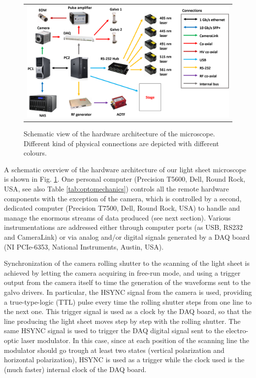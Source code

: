 \documentclass[12pt]{spieman}  %
\begin{document}
	\begin{figure}
   \begin{center}
   \begin{tabular}{c}
   \includegraphics[width=\textwidth]{connectivity.eps}
   \end{tabular}
   \end{center}
   \caption{\label{fig:connectivity} Schematic view of the hardware architecture of the microscope. Different kind of physical connections are depicted with different colours.} 
   \end{figure}

A schematic overview of the hardware architecture of our light sheet microscope is shown in Fig. \ref{fig:connectivity}. One personal computer (Precision T5600, Dell, Round Rock, USA, see also Table \ref{tab:optomechanics}) controls all the remote hardware components with the exception of the camera, which is controlled by a second, dedicated computer (Precision T7500, Dell, Round Rock, USA) to handle and manage the enormous streams of data produced (see next section). Various instrumentations are addressed either through computer ports (as USB, RS232 and CameraLink) or via analog and/or digital signals generated by a DAQ board (NI PCIe-6353, National Instruments, Austin, USA).

Synchronization of the camera rolling shutter to the scanning of the light sheet is achieved by letting the camera acquiring in free-run mode, and using a trigger output from the camera itself to time the generation of the waveforms sent to the galvo drivers. In particular, the HSYNC signal from the camera is used, providing a true-type-logic (TTL) pulse every time the rolling shutter steps from one line to the next one. This trigger signal is used as a clock by the DAQ board, so that the line producing the light sheet moves step by step with the rolling shutter. The same HSYNC signal is used to trigger the DAQ digital signal sent to the electro-optic laser modulator. In this case, since at each position of the scanning line the modulator should go trough at least two states (vertical polarization and horizontal polarization), HSYNC is used as a trigger while the clock used is the (much faster) internal clock of the DAQ board.
\end{document}
